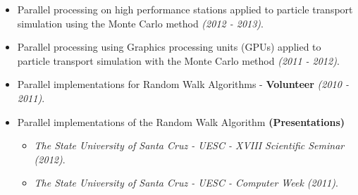 \documentclass[10pt, a4paper, oneside, final]{scrartcl} %
\begin{document}
\begin{itemize}\itemsep1.0pt
\item Parallel processing on high performance stations applied to particle transport simulation using the Monte Carlo method \textit{(2012 - 2013)}.

\item Parallel processing using Graphics processing units (GPUs) applied to particle transport simulation with the Monte Carlo method \textit{(2011 - 2012)}.

\item Parallel implementations for Random Walk Algorithms - \textbf{Volunteer} \textit{(2010 - 2011)}.

\item Parallel implementations of the Random Walk Algorithm \textbf{(Presentations)}

	\begin{itemize}
      \item \textit{The State University of Santa Cruz - UESC - XVIII Scientific Seminar (2012)}.
      \item \textit{The State University of Santa Cruz - UESC - Computer Week (2011)}.
	\end{itemize}
\end{itemize}



%
\end{document}
